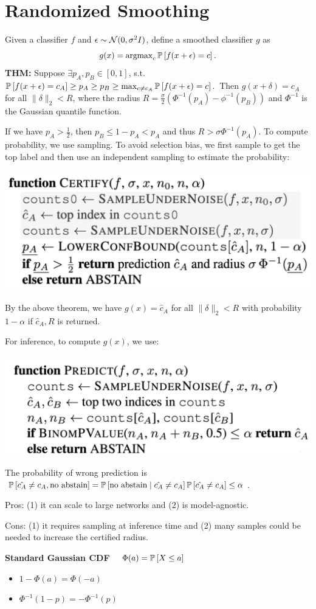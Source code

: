 \section{Randomized Smoothing}

Given a classifier $f$ and $\epsilon \sim \No(0,\sigma^2 I)$, define a smoothed classifier $g$ as
$$g(x)=\argmax_c \P\left[f(x+\epsilon)=c\right].$$\noindent
\textbf{THM:} Suppose $\exists {p_A}, {p_B} \in [0,1]$, s.t. $\P\left[f(x+\epsilon)=c_A\right] \ge {p_A} \ge {p_B} \ge \max_{c\ne c_A} \P\left[f(x+\epsilon)=c\right].$ Then $g(x+\delta)=c_A$ for all $\|\delta\|_2 <R$, where the radius $R=\frac{\sigma}{2} (\Phi^{-1}({p_A})-\phi^{-1}({p_B}))$ and $\Phi^{-1}$ is the Gaussian quantile function.

If we have ${p_A}>\frac{1}{2}$, then ${p_B}\leq1-{p_A}<p_A$ and thus $R>\sigma \Phi^{-1}({p_A})$. To compute probability, we use sampling. To avoid selection bias, we first sample to get the top label and then use an independent sampling to estimate the probability:

\includegraphics[width=\columnwidth]{img/rand_smooth.png}

By the above theorem, we have $g(x)=\hat{c}_A$ for all $\|\delta\|_2 <R$
with probability $1-\alpha$ if $\hat{c}_A, R$ is returned.

For inference, to compute $g(x)$, we use:

\includegraphics[width=\columnwidth]{img/rand-predict.png}

The probability of wrong prediction is $\P\left[\hat{c_A}\ne c_A, \text{no abstain}\right] = \P\left[\text{no abstain} \mid \hat{c_A}\ne c_A\right] \P\left[\hat{c_A}\ne c_A\right]\le \alpha$.

Pros: (1) it can scale to large networks and (2) is model-agnostic.

Cons: (1) it requires sampling at inference time and (2) many samples could be needed to increase the certified radius.

\textbf{Standard Gaussian CDF} \ \ $\Phi(a)=\P\left[X\le a\right]$
\begin{itemize}
    \item[] $1-\Phi(a)=\Phi(-a)$
    \item[] $\Phi^{-1}(1-p)=-\Phi^{-1}(p)$
\end{itemize}